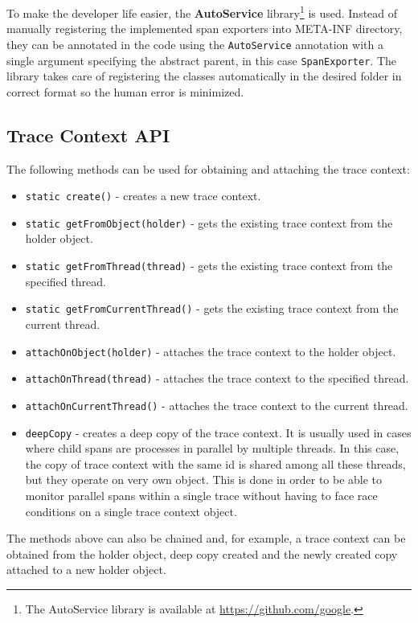 To make the developer life easier, the \textbf{AutoService} library\footnote{The AutoService library is available at \url{https://github.com/google}.} is used. Instead of manually registering the implemented span exporters into META-INF directory, they can be annotated in the code using the \texttt{AutoService} annotation with a single argument specifying the abstract parent, in this case \texttt{SpanExporter}. The library takes care of registering the classes automatically in the desired folder in correct format so the human error is minimized.

\subsection{Trace Context API}
\label{imp:trace_context_api}
The following methods can be used for obtaining and attaching the trace context:
\begin{itemize}
	\item \texttt{static create()} - creates a new trace context.
	\item \texttt{static getFromObject(holder)} - gets the existing trace context from the holder object.
	\item \texttt{static getFromThread(thread)} - gets the existing trace context from the specified thread.
	\item \texttt{static getFromCurrentThread()} -  gets the existing trace context from the current thread.
	\item \texttt{attachOnObject(holder)} - attaches the trace context to the holder object.
	\item \texttt{attachOnThread(thread)} - attaches the trace context to the specified \newline thread.
	\item \texttt{attachOnCurrentThread()} - attaches the trace context to the current \newline thread.
	\item \texttt{deepCopy} - creates a deep copy of the trace context. It is usually used in cases where child spans are processes in parallel by multiple threads. In this case, the copy of trace context with the same id is shared among all these threads, but they operate on very own object. This is done in order to be able to monitor parallel spans within a single trace without having to face race conditions on a single trace context object.
\end{itemize}

The methods above can also be chained and, for example, a trace context can be obtained from the holder object, deep copy created and the newly created copy attached to a new holder object.
